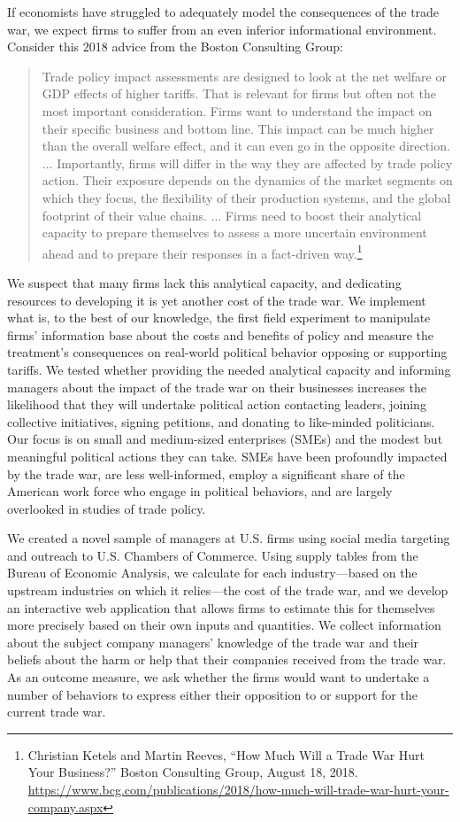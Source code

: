 \documentclass{article}
\begin{document}
If economists have struggled to adequately model the consequences of the trade war, we expect firms to suffer from an even inferior informational environment. Consider this 2018 advice from the Boston Consulting Group:

\begin{quote}
Trade policy impact assessments are designed to look at the net welfare or GDP effects of higher tariffs. That is relevant for firms but often not the most important consideration. Firms want to understand the impact on their specific business and bottom line. This impact can be much higher than the overall welfare effect, and it can even go in the opposite direction. ...
Importantly, firms will differ in the way they are affected by trade policy action. Their exposure depends on the dynamics of the market segments on which they focus, the flexibility of their production systems, and the global footprint of their value chains. ... Firms need to boost their analytical capacity to prepare themselves to assess a more uncertain environment ahead and to prepare their responses in a fact-driven way.\footnote{Christian Ketels and Martin Reeves, ``How Much Will a Trade War Hurt Your Business?'' Boston Consulting Group, August 18, 2018. \url{https://www.bcg.com/publications/2018/how-much-will-trade-war-hurt-your-company.aspx}}
\end{quote}

We suspect that many firms lack this analytical capacity, and dedicating resources to developing it is yet another cost of the trade war. We implement what is, to the best of our knowledge, the first field experiment to manipulate firms' information base about the costs and benefits of policy and measure the treatment's consequences on real-world political behavior opposing or supporting tariffs. We tested whether providing the needed analytical capacity and informing managers about the impact of the trade war on their businesses increases the likelihood that they will undertake political action contacting leaders, joining collective initiatives, signing petitions, and donating to like-minded politicians. Our focus is on small and medium-sized enterprises (SMEs) and the modest but meaningful political actions they can take. SMEs have been profoundly impacted by the trade war, are less well-informed, employ a significant share of the American work force who engage in political behaviors, and are largely overlooked in studies of trade policy. 

We created a novel sample of managers at U.S. firms using social media targeting and outreach to U.S. Chambers of Commerce. Using supply tables from the Bureau of Economic Analysis, we calculate for each industry---based on the upstream industries on which it relies---the cost of the trade war, and we develop an interactive web application that allows firms to estimate this for themselves more precisely based on their own inputs and quantities. We collect information about the subject company managers' knowledge of the trade war and their beliefs about the harm or help that their companies received from the trade war. As an outcome measure, we ask whether the firms would want to undertake a number of behaviors to express either their opposition to or support for the current trade war.
\end{document}
